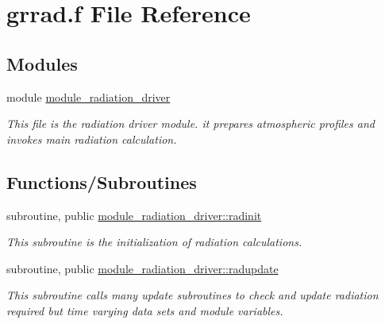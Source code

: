 \hypertarget{grrad_8f}{}\section{grrad.\+f File Reference}
\label{grrad_8f}
\subsection*{Modules}
\begin{DoxyCompactItemize}
\item 
module \hyperlink{namespacemodule__radiation__driver}{module\+\_\+radiation\+\_\+driver}
\begin{DoxyCompactList}\small\item\em This file is the radiation driver module. it prepares atmospheric profiles and invokes main radiation calculation. \end{DoxyCompactList}\end{DoxyCompactItemize}
\subsection*{Functions/\+Subroutines}
{\bf }\par
\begin{DoxyCompactItemize}
\item 
subroutine, public \hyperlink{namespacemodule__radiation__driver_af039e0c23dc6ab8d2f8b1c1c796ac0da}{module\+\_\+radiation\+\_\+driver\+::radinit}                                                                                             
\begin{DoxyCompactList}\small\item\em This subroutine is the initialization of radiation calculations. \end{DoxyCompactList}\end{DoxyCompactItemize}

{\bf }\par
\begin{DoxyCompactItemize}
\item 
subroutine, public \hyperlink{namespacemodule__radiation__driver_a47f0e4defe607fbfc751f6c9274f459a}{module\+\_\+radiation\+\_\+driver\+::radupdate}                                                                                         
\begin{DoxyCompactList}\small\item\em This subroutine calls many update subroutines to check and update radiation required but time varying data sets and module variables. \end{DoxyCompactList}\end{DoxyCompactItemize}

